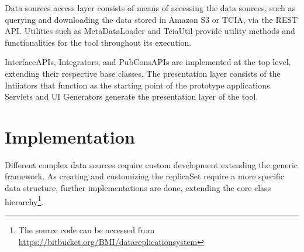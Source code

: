 \documentclass[conference]{IEEEtran}
\begin{document}
Data sources access layer consists of means of accessing the data sources, such as querying and downloading the data stored in Amazon S3 or TCIA, via the REST API. Utilities such as MetaDataLoader and TciaUtil provide utility methods and functionalities for the tool throughout its execution.

InterfaceAPIs, Integrators, and PubConsAPIs are implemented at the top level, extending their respective base classes. The presentation layer consists of the Intiiators that function as the starting point of the prototype applications. Servlets and UI Generators generate the presentation layer of the tool.

\section{Implementation}
Different complex data sources require custom development extending the generic framework. As creating and customizing the replicaSet require a more specific data structure, further implementations are done, extending the core class hierarchy\footnote{The source code can be accessed from \url{https://bitbucket.org/BMI/datareplicationsystem}}. 
\end{document}
